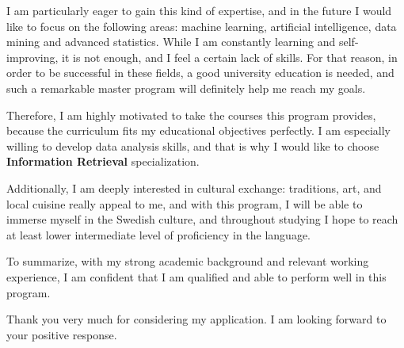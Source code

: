 \documentclass[a4paper,12pt]{article}
\begin{document}
I am particularly eager to gain this kind of expertise, and in the future I would like to focus on the following areas: machine learning, artificial intelligence, data mining and advanced statistics. While I am constantly learning and self-improving, it is not enough, and I feel a certain lack of skills. For that reason, in order to be successful in these fields, a good university education is needed, and such a remarkable master program will definitely help me reach my goals.

Therefore, I am highly motivated to take the courses this program provides, because the curriculum fits my educational objectives perfectly. I am especially willing to develop data analysis skills, and that is why I would like to choose \textbf{Information Retrieval} specialization.

Additionally, I am deeply interested in cultural exchange: traditions, art, and local cuisine really appeal to me, and with this program, I will be able to immerse myself in the Swedish culture, and throughout studying I hope to reach at least lower intermediate level of proficiency in the language.

To summarize, with my strong academic background and relevant working experience, I am confident that I am qualified and able to perform well in this program.

Thank you very much for considering my application. I am looking forward to your positive response.
\end{document}
